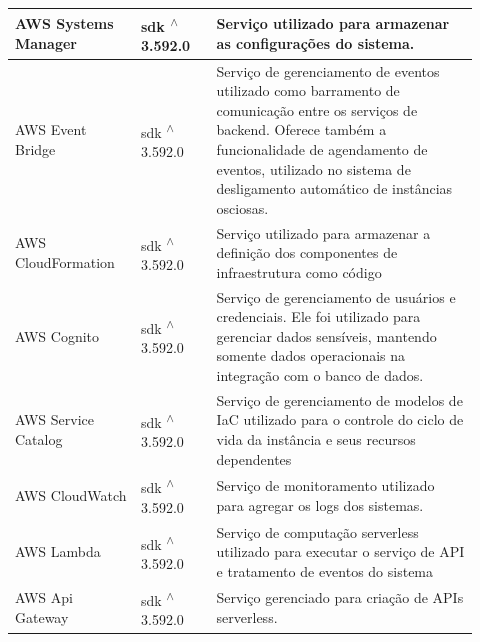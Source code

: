 \begin{longtable}{p{0.25\linewidth} p{0.15\linewidth} p{0.525\linewidth}}
AWS Systems Manager \citep{awssystemsmanagerdocs} & sdk \textsuperscript{$\wedge$}3.592.0 & Serviço utilizado para armazenar as configurações do sistema. \\

\hline

AWS Event Bridge \citep{awseventbridgedocs} & sdk \textsuperscript{$\wedge$}3.592.0 & Serviço de gerenciamento de eventos utilizado como barramento de comunicação entre os serviços de backend. Oferece também a funcionalidade de agendamento de eventos, utilizado no sistema de desligamento automático de instâncias osciosas. \\

\hline

AWS CloudFormation \citep{awscloudformationdocs} & sdk \textsuperscript{$\wedge$}3.592.0 & Serviço utilizado para armazenar a definição dos componentes de infraestrutura como código \\

\hline

AWS Cognito \citep{awscognito} & sdk \textsuperscript{$\wedge$}3.592.0 & Serviço de gerenciamento de usuários e credenciais. Ele foi utilizado para gerenciar dados sensíveis, mantendo somente dados operacionais na integração com o banco de dados. \\

\hline

AWS Service Catalog \citep{awsservicecatalogdocs} & sdk \textsuperscript{$\wedge$}3.592.0 & Serviço de gerenciamento de modelos de IaC utilizado para o controle do ciclo de vida da instância e seus recursos dependentes \\

\hline

AWS CloudWatch \citep{awscloudwatchdocs} & sdk \textsuperscript{$\wedge$}3.592.0 & Serviço de monitoramento utilizado para agregar os logs dos sistemas. \\

\hline

AWS Lambda \citep{awslambdadocs} & sdk \textsuperscript{$\wedge$}3.592.0 & Serviço de computação serverless utilizado para executar o serviço de API e tratamento de eventos do sistema \\

\hline

AWS Api Gateway \citep{awsapigatewaydocs} & sdk \textsuperscript{$\wedge$}3.592.0 & Serviço gerenciado para criação de APIs serverless. \\


\end{longtable}
